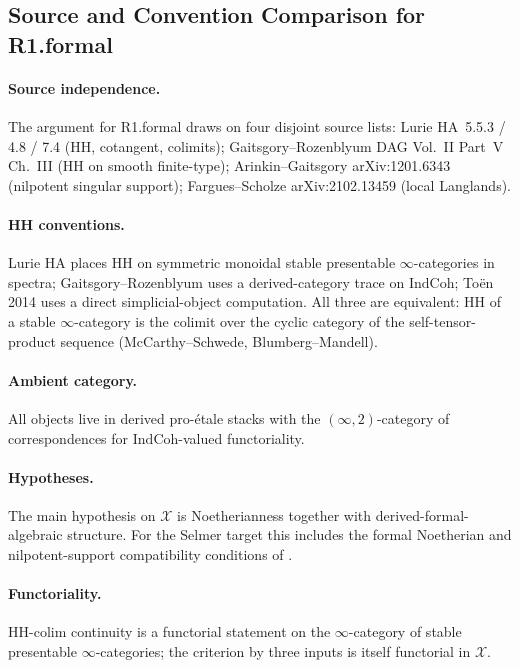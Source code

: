 \subsection{Source and Convention Comparison for R1.formal}
\label{v4-arith:bzn-sub:R1formal-obstruction-analysis}

\paragraph{Source independence.} The argument for R1.formal draws on
four disjoint source lists: Lurie HA~5.5.3 / 4.8 / 7.4 (HH,
cotangent, colimits); Gaitsgory--Rozenblyum DAG Vol.~II Part~V
Ch.~III (HH on smooth finite-type); Arinkin--Gaitsgory
arXiv:1201.6343 (nilpotent singular support); Fargues--Scholze
arXiv:2102.13459 (local Langlands).

\paragraph{HH conventions.} Lurie HA places HH on symmetric monoidal
stable presentable \(\infty\)-categories in spectra; Gaitsgory--Rozenblyum
uses a derived-category trace on \(\mathrm{IndCoh}\); To\"en 2014
uses a direct simplicial-object computation. All three are equivalent:
HH of a stable \(\infty\)-category is the colimit over the cyclic
category of the self-tensor-product sequence (McCarthy--Schwede,
Blumberg--Mandell).

\paragraph{Ambient category.} All objects live in derived pro-\'etale
stacks with the \((\infty,2)\)-category of correspondences for
\(\mathrm{IndCoh}\)-valued functoriality.

\paragraph{Hypotheses.} The main hypothesis on \(\mathcal{X}\) is
Noetherianness together with derived-formal-algebraic structure.  For
the Selmer target this includes the formal Noetherian and
nilpotent-support compatibility conditions of
.

\paragraph{Functoriality.} HH-colim continuity is a functorial
statement on the \(\infty\)-category of stable presentable
\(\infty\)-categories; the criterion by three inputs is
itself functorial in \(\mathcal{X}\).


